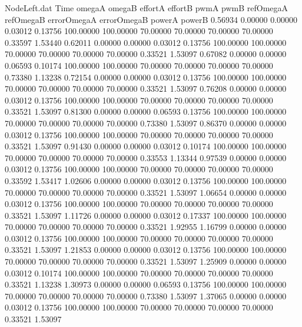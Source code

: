 \begin{filecontents}{NodeLeft.dat}
Time omegaA omegaB effortA effortB pwmA pwmB refOmegaA refOmegaB errorOmegaA errorOmegaB powerA powerB
   0.56934    0.00000    0.00000     0.03012    0.13756  100.00000  100.00000   70.00000   70.00000   70.00000   70.00000    0.33597    1.53440
   0.62011    0.00000    0.00000     0.03012    0.13756  100.00000  100.00000   70.00000   70.00000   70.00000   70.00000    0.33521    1.53097
   0.67082    0.00000    0.00000     0.06593    0.10174  100.00000  100.00000   70.00000   70.00000   70.00000   70.00000    0.73380    1.13238
   0.72154    0.00000    0.00000     0.03012    0.13756  100.00000  100.00000   70.00000   70.00000   70.00000   70.00000    0.33521    1.53097
   0.76208    0.00000    0.00000     0.03012    0.13756  100.00000  100.00000   70.00000   70.00000   70.00000   70.00000    0.33521    1.53097
   0.81300    0.00000    0.00000     0.06593    0.13756  100.00000  100.00000   70.00000   70.00000   70.00000   70.00000    0.73380    1.53097
   0.86370    0.00000    0.00000     0.03012    0.13756  100.00000  100.00000   70.00000   70.00000   70.00000   70.00000    0.33521    1.53097
   0.91430    0.00000    0.00000     0.03012    0.10174  100.00000  100.00000   70.00000   70.00000   70.00000   70.00000    0.33553    1.13344
   0.97539    0.00000    0.00000     0.03012    0.13756  100.00000  100.00000   70.00000   70.00000   70.00000   70.00000    0.33592    1.53417
   1.02606    0.00000    0.00000     0.03012    0.13756  100.00000  100.00000   70.00000   70.00000   70.00000   70.00000    0.33521    1.53097
   1.06654    0.00000    0.00000     0.03012    0.13756  100.00000  100.00000   70.00000   70.00000   70.00000   70.00000    0.33521    1.53097
   1.11726    0.00000    0.00000     0.03012    0.17337  100.00000  100.00000   70.00000   70.00000   70.00000   70.00000    0.33521    1.92955
   1.16799    0.00000    0.00000     0.03012    0.13756  100.00000  100.00000   70.00000   70.00000   70.00000   70.00000    0.33521    1.53097
   1.21853    0.00000    0.00000     0.03012    0.13756  100.00000  100.00000   70.00000   70.00000   70.00000   70.00000    0.33521    1.53097
   1.25909    0.00000    0.00000     0.03012    0.10174  100.00000  100.00000   70.00000   70.00000   70.00000   70.00000    0.33521    1.13238
   1.30973    0.00000    0.00000     0.06593    0.13756  100.00000  100.00000   70.00000   70.00000   70.00000   70.00000    0.73380    1.53097
   1.37065    0.00000    0.00000     0.03012    0.13756  100.00000  100.00000   70.00000   70.00000   70.00000   70.00000    0.33521    1.53097

\end{filecontents}
